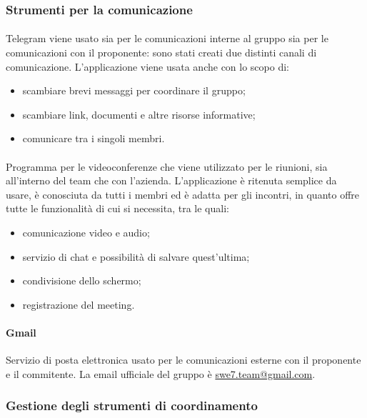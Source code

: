 \subsubsection{Strumenti per la comunicazione}
\paragraph{} \hfill \break
Telegram viene usato sia per le comunicazioni interne al gruppo sia per le comunicazioni con il proponente:
sono stati creati due distinti canali di comunicazione. L'applicazione viene usata anche con lo scopo di:
\begin{itemize}
    \item scambiare brevi messaggi per coordinare il gruppo;
    \item scambiare link, documenti e altre risorse informative;
    \item comunicare tra i singoli membri.
\end{itemize}

\paragraph{} \hfill \break
Programma per le videoconferenze che viene utilizzato per le riunioni, sia all'interno del team che con l'azienda. L'applicazione è ritenuta semplice da usare,
è conosciuta da tutti i membri ed è adatta per gli incontri, in quanto offre tutte le funzionalità di cui si necessita, tra le quali:
\begin{itemize}
    \item comunicazione video e audio;
    \item servizio di chat e possibilità di salvare quest'ultima;
    \item condivisione dello schermo;
    \item registrazione del meeting.
\end{itemize}

\paragraph{Gmail} \hfill \break
Servizio di posta elettronica usato per le comunicazioni esterne con il proponente e il commitente. La email ufficiale
del gruppo è \href{mailto:swe7.team@gmail.com}{swe7.team@gmail.com}.

\subsubsection{Gestione degli strumenti di coordinamento}

